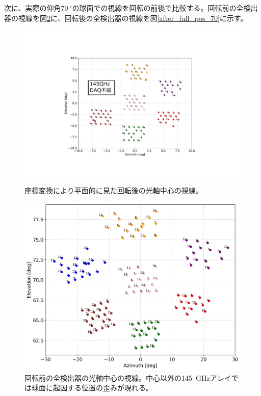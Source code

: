 次に、実際の仰角$\SI{70}{^{\circ}}$の球面での視線を回転の前後で比較する。回転前の全検出器の視線を図\ref{before_full_beam_pos}に、回転後の全検出器の視線を図\ref{after_full_pos_70}に示す。
\begin{figure}[htbp]
  \centering
  \includegraphics[width=0.9\columnwidth]{5_alignment/figs/after_full_pos_0_mod.pdf}
  \caption{座標変換により平面的に見た回転後の光軸中心の視線。}
  \label{after_full_pos_0}
\end{figure}
\begin{figure}[htbp]
  \centering
  \includegraphics[width=0.85\columnwidth]{5_alignment/figs/before_full_pos_70.png}
  \caption{回転前の全検出器の光軸中心の視線。中心以外の\SI{145}{GHz}アレイでは球面に起因する位置の歪みが現れる。}
  \label{before_full_beam_pos}
\end{figure}
